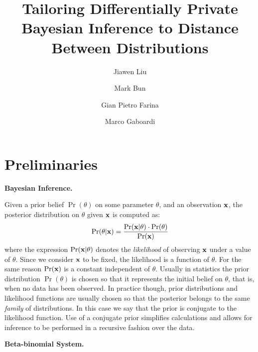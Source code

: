 \documentclass{article}
\begin{document}
\title{Tailoring Differentially Private Bayesian Inference to Distance Between Distributions}

\author[*]{Jiawen Liu}
\author[**]{Mark Bun}
\author[*]{Gian Pietro Farina}
\author[*]{Marco Gaboardi}
\date{}
\maketitle



\section{Preliminaries}
\label{sec_background}

\noindent \textbf{Bayesian Inference.}

Given a prior belief $\Pr(\theta)$ on some parameter $\theta$,
and an observation $\textbf{x}$, the posterior distribution on $\theta$ given $\textbf{x}$ is computed as:
\[
  \Pr(\theta | \textbf{x}) = \frac{\Pr(\textbf{x} | \theta) \cdot \Pr(\theta)}{\Pr(\textbf{x})}
\]
where the expression $\Pr(\textbf{x} | \theta)$ denotes the
\emph{likelihood} of observing $\textbf{x}$ under a value of
$\theta$. Since we consider $\textbf{x}$ to be fixed, the likelihood is
a function of $\theta$.
For the same reason $\Pr(\textbf{x})$ is a constant independent of $\theta$.
Usually in statistics the prior distribution $\Pr(\theta)$ is chosen so that it represents
the initial belief on $\theta$, that is, when no data has been observed. In practice though,
prior distributions and likelihood functions are usually chosen so that the posterior
belongs to the same \emph{family} of distributions. In this case we say that the prior
is conjugate to the likelihood function. Use of a conjugate prior
simplifies calculations and allows for inference to be performed in a
recursive fashion over the data.


\noindent \textbf{Beta-binomial System.}
\end{document}
